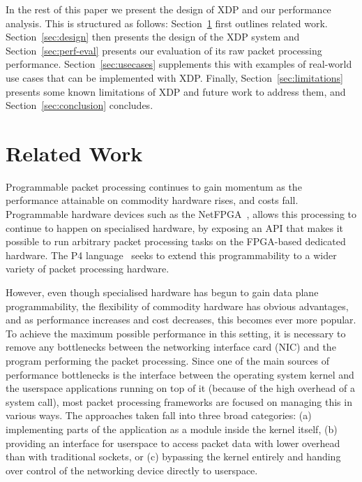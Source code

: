 \documentclass[10pt,sigconf]{acmart}
\begin{document}
In the rest of this paper we present the design of XDP and our performance
analysis. This is structured as follows: Section~\ref{sec:related-work} first
outlines related work. Section~\ref{sec:design} then presents the design of the
XDP system and Section~\ref{sec:perf-eval} presents our evaluation of its raw
packet processing performance. Section~\ref{sec:usecases} supplements this with
examples of real-world use cases that can be implemented with XDP. Finally,
Section~\ref{sec:limitations} presents some known limitations of XDP and future
work to address them, and Section~\ref{sec:conclusion} concludes.

\section{Related Work}%
\label{sec:related-work}

Programmable packet processing continues to gain momentum as the performance
attainable on commodity hardware rises, and costs fall. Programmable hardware
devices such as the NetFPGA~\cite{lockwood2007netfpga}, allows this processing
to continue to happen on specialised hardware, by exposing an API that makes it
possible to run arbitrary packet processing tasks on the FPGA-based dedicated
hardware. The P4 language~\cite{bosshart2014p4} seeks to extend this
programmability to a wider variety of packet processing hardware.

However, even though specialised hardware has begun to gain data plane
programmability, the flexibility of commodity hardware has obvious advantages,
and as performance increases and cost decreases, this becomes ever more popular.
To achieve the maximum possible performance in this setting, it is necessary to
remove any bottlenecks between the networking interface card (NIC) and the
program performing the packet processing. Since one of the main sources of
performance bottlenecks is the interface between the operating system kernel and
the userspace applications running on top of it (because of the high overhead of
a system call), most packet processing frameworks are focused on managing this
in various ways. The approaches taken fall into three broad categories: (a)
implementing parts of the application as a module inside the kernel itself, (b)
providing an interface for userspace to access packet data with lower overhead
than with traditional sockets, or (c) bypassing the kernel entirely and handing
over control of the networking device directly to userspace.
\end{document}
